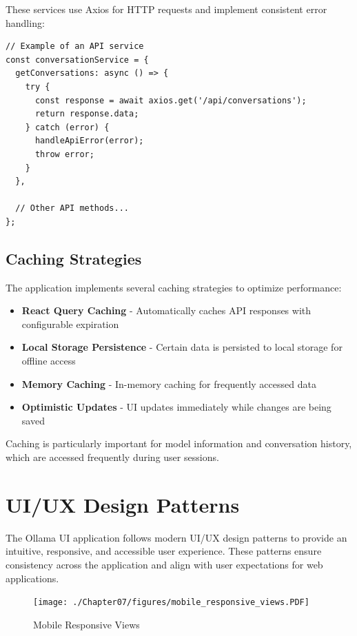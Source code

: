 These services use Axios for HTTP requests and implement consistent error handling:

\begin{verbatim}
// Example of an API service
const conversationService = {
  getConversations: async () => {
    try {
      const response = await axios.get('/api/conversations');
      return response.data;
    } catch (error) {
      handleApiError(error);
      throw error;
    }
  },
  
  // Other API methods...
};
\end{verbatim}

\subsection{Caching Strategies}

The application implements several caching strategies to optimize performance:

\begin{itemize}
  \item \textbf{React Query Caching} - Automatically caches API responses with configurable expiration
  \item \textbf{Local Storage Persistence} - Certain data is persisted to local storage for offline access
  \item \textbf{Memory Caching} - In-memory caching for frequently accessed data
  \item \textbf{Optimistic Updates} - UI updates immediately while changes are being saved
\end{itemize}

Caching is particularly important for model information and conversation history, which are accessed frequently during user sessions.

\section{UI/UX Design Patterns}

The Ollama UI application follows modern UI/UX design patterns to provide an intuitive, responsive, and accessible user experience. These patterns ensure consistency across the application and align with user expectations for web applications.

\begin{figure}
    \centering
    \texttt{[image: ./Chapter07/figures/mobile\_responsive\_views.PDF]}
    \caption{Mobile Responsive Views}
    \label{fig:mobile-responsive-views}
\end{figure}
\clearpage

